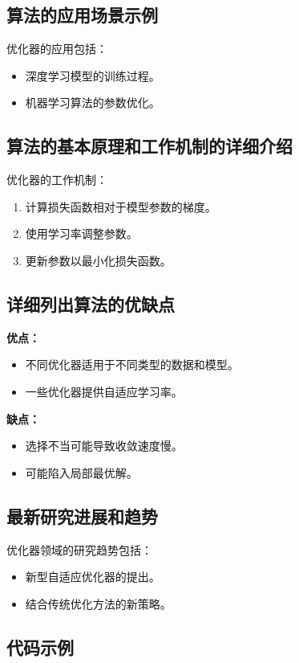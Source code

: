 \subsection*{算法的应用场景示例}
优化器的应用包括：
\begin{itemize}
    \item 深度学习模型的训练过程。
    \item 机器学习算法的参数优化。
\end{itemize}

\subsection*{算法的基本原理和工作机制的详细介绍}
优化器的工作机制：
\begin{enumerate}
    \item 计算损失函数相对于模型参数的梯度。
    \item 使用学习率调整参数。
    \item 更新参数以最小化损失函数。
\end{enumerate}

\subsection*{详细列出算法的优缺点}
\textbf{优点：}
\begin{itemize}
    \item 不同优化器适用于不同类型的数据和模型。
    \item 一些优化器提供自适应学习率。
\end{itemize}

\textbf{缺点：}
\begin{itemize}
    \item 选择不当可能导致收敛速度慢。
    \item 可能陷入局部最优解。
\end{itemize}

\subsection*{最新研究进展和趋势}
优化器领域的研究趋势包括：
\begin{itemize}
    \item 新型自适应优化器的提出。
    \item 结合传统优化方法的新策略。
\end{itemize}
\subsection*{代码示例}
\begin{lstlisting}

\end{lstlisting}


